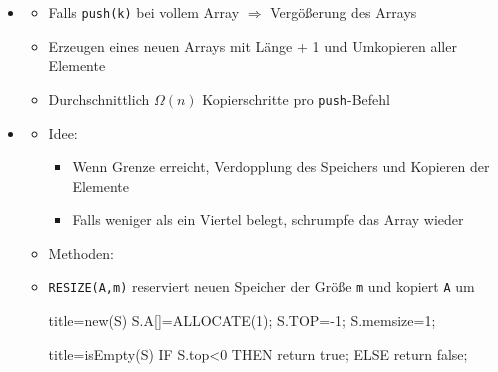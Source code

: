 \documentclass[
    12pt,
    a4paper,
    ngerman,
    color=3b,%
    marginpar=false,
    colorback=false,
    leqno,
]{tudaexercise}
\begin{document}
\begin{itemize}
    \item {}
          \begin{itemize}
              \item Falls \texttt{push(k)} bei vollem Array $\Rightarrow$ Vergößerung des Arrays
              \item Erzeugen eines neuen Arrays mit Länge + 1 und Umkopieren aller Elemente
              \item Durchschnittlich $\Omega(n)$ Kopierschritte pro \texttt{push}-Befehl
          \end{itemize}
          \clearpage
    \item {}
          \begin{itemize}
              \item Idee:
                    \begin{itemize}
                        \item Wenn Grenze erreicht, Verdopplung des Speichers und Kopieren der Elemente
                        \item Falls weniger als ein Viertel belegt, schrumpfe das Array wieder
                    \end{itemize}
              \item Methoden:
              \item[] \texttt{RESIZE(A,m)} reserviert neuen Speicher der Grö\ss e \texttt{m} und kopiert \texttt{A} um\\
                    \begin{minipage}[t]{.5\textwidth}
                        \begin{ccode}[autogobble]{title=new(S)}
                            S.A[]=ALLOCATE(1);
                            S.TOP=-1;
                            S.memsize=1;
                        \end{ccode}
                    \end{minipage}
                    \begin{minipage}[t]{.4\textwidth}
                        \begin{ccode}[autogobble]{title=isEmpty(S)}
                            IF S.top<0 THEN
                                return true;
                            ELSE
                                return false;
                        \end{ccode}
                    \end{minipage}
                    \\

\end{itemize}
\end{itemize}
\end{document}
